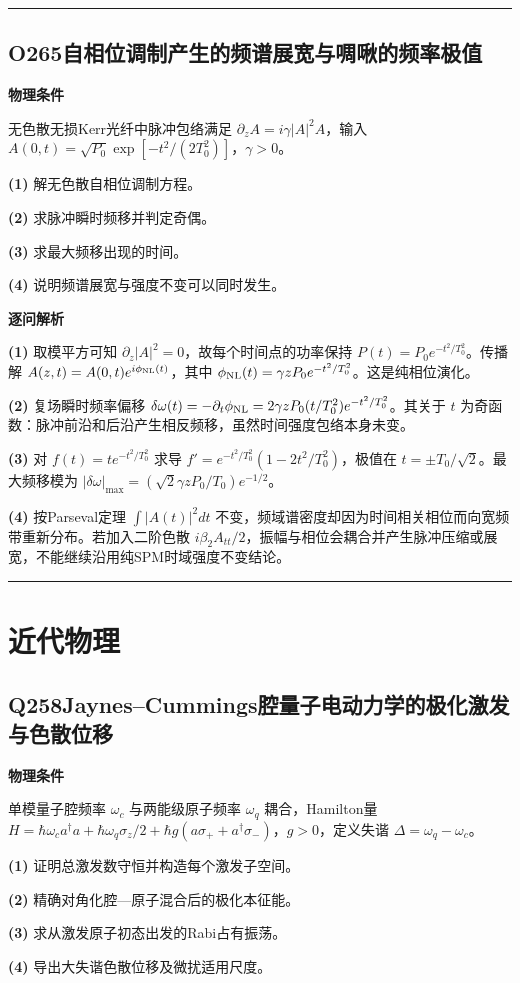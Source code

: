 \documentclass[UTF8,a4paper,11pt,oneside,openany]{ctexbook}
\begin{document}
\par\bigskip\hrule\bigskip
\section*{O265\quad 自相位调制产生的频谱展宽与啁啾的频率极值}
\textbf{物理条件}\par 无色散无损Kerr光纤中脉冲包络满足 \(\partial_zA=i\gamma|A|^2A\)，输入 \(A(0,t)=\sqrt{P_0}\exp[-t^2/(2T_0^2)]\)，\(\gamma>0\)。
\par\noindent\textbf{(1)} 解无色散自相位调制方程。
\par\noindent\textbf{(2)} 求脉冲瞬时频移并判定奇偶。
\par\noindent\textbf{(3)} 求最大频移出现的时间。
\par\noindent\textbf{(4)} 说明频谱展宽与强度不变可以同时发生。

\par\medskip\noindent\textbf{逐问解析}
\par\noindent\textbf{(1)} 取模平方可知 \(\partial_z|A|^2=0\)，故每个时间点的功率保持 \(P(t)=P_0e^{-t^2/T_0^2}\)。传播解 \(A(z,t)=A(0,t)e^{i\phi_{\rm NL}(t)}\)，其中 \(\phi_{\rm NL}(t)=\gamma zP_0e^{-t^2/T_0^2}\)。这是纯相位演化。
\par\noindent\textbf{(2)} 复场瞬时频率偏移 \(\delta\omega(t)=-\partial_t\phi_{\rm NL}=2\gamma zP_0(t/T_0^2)e^{-t^2/T_0^2}\)。其关于 \(t\) 为奇函数：脉冲前沿和后沿产生相反频移，虽然时间强度包络本身未变。
\par\noindent\textbf{(3)} 对 \(f(t)=t e^{-t^2/T_0^2}\) 求导 \(f'=e^{-t^2/T_0^2}(1-2t^2/T_0^2)\)，极值在 \(t=\pm T_0/\sqrt2\)。最大频移模为 \(|\delta\omega|_{\max}=(\sqrt2\gamma zP_0/T_0)e^{-1/2}\)。
\par\noindent\textbf{(4)} 按Parseval定理 \(\int|A(t)|^2dt\) 不变，频域谱密度却因为时间相关相位而向宽频带重新分布。若加入二阶色散 \(i\beta_2A_{tt}/2\)，振幅与相位会耦合并产生脉冲压缩或展宽，不能继续沿用纯SPM时域强度不变结论。

\par\bigskip\hrule\bigskip
\chapter{近代物理}
\section*{Q258\quad Jaynes–Cummings腔量子电动力学的极化激发与色散位移}
\textbf{物理条件}\par 单模量子腔频率 \(\omega_c\) 与两能级原子频率 \(\omega_q\) 耦合，Hamilton量 \(H=\hbar\omega_c a^\dagger a+\hbar\omega_q\sigma_z/2+\hbar g(a\sigma_++a^\dagger\sigma_-)\)，\(g>0\)，定义失谐 \(\Delta=\omega_q-\omega_c\)。
\par\noindent\textbf{(1)} 证明总激发数守恒并构造每个激发子空间。
\par\noindent\textbf{(2)} 精确对角化腔—原子混合后的极化本征能。
\par\noindent\textbf{(3)} 求从激发原子初态出发的Rabi占有振荡。
\par\noindent\textbf{(4)} 导出大失谐色散位移及微扰适用尺度。
\end{document}
